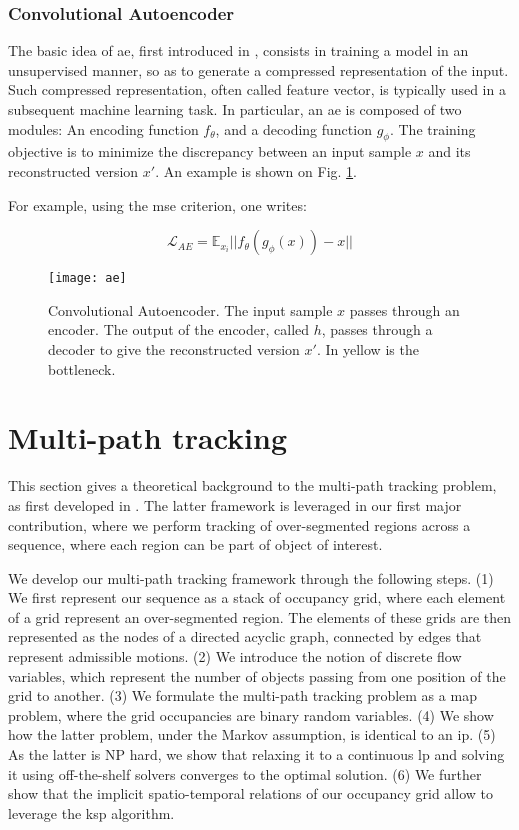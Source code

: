 \subsubsection{Convolutional Autoencoder}
The basic idea of \gls{ae}, first introduced in \cite{vincent10}, consists in training a model in an unsupervised manner, so as to generate a compressed representation of the input.
Such compressed representation, often called feature vector, is typically used in a subsequent machine learning task.
In particular, an \gls{ae} is composed of two modules: An encoding function $f_{\theta}$, and a decoding function $g_{\phi}$.
The training objective is to minimize the discrepancy between an input sample $x$ and its reconstructed version $x'$.
An example is shown on Fig. \ref{fig:ae}.

For example, using the \gls{mse} criterion, one writes:

\begin{equation}
\mathcal{L}_{AE} = \mathbb{E}_{x_{i}}||f_{\theta}(g_{\phi}(x)) - x ||
\end{equation}


\begin{figure}[!htpb]
  \centering
  \texttt{[image: ae]}
  \caption{Convolutional Autoencoder.
    The input sample $x$ passes through an encoder.
    The output of the encoder, called $h$, passes through a decoder to give the reconstructed version $x'$.
    In yellow is the bottleneck.}
  \label{fig:ae}
\end{figure}

\section{Multi-path tracking}
This section gives a theoretical background to the multi-path tracking problem, as first developed in \cite{berclaz11}.
The latter framework is leveraged in our first major contribution, where we perform tracking of over-segmented regions across a sequence, where each region can be part of object of interest.

We develop our multi-path tracking framework through the following steps.
(1) We first represent our sequence as a stack of occupancy grid, where each element of a grid represent an over-segmented region.
The elements of these grids are then represented as the nodes of a directed acyclic graph, connected by edges that represent admissible motions.
(2) We introduce the notion of discrete flow variables, which represent the number of objects passing from one position of the grid to another.
(3) We formulate the multi-path tracking problem as a \gls{map} problem, where the grid occupancies are binary random variables.
(4) We show how the latter problem, under the Markov assumption, is identical to an \gls{ip}.
(5) As the latter is NP hard, we show that relaxing it to a continuous \gls{lp} and solving it using off-the-shelf solvers converges to the optimal solution.
(6) We further show that the implicit spatio-temporal relations of our occupancy grid allow to leverage the \gls{ksp} algorithm.

